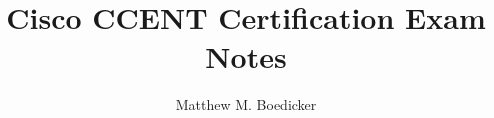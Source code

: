 \documentclass{article}
\begin{document}
\title{Cisco CCENT Certification Exam Notes}
\author{Matthew M. Boedicker}

\maketitle

\tableofcontents














\end{document}
